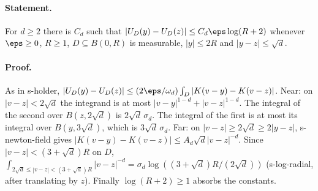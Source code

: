 \paragraph{Statement.} For $d\geq2$ there is $C_d$ such that $|U_D(y)-U_D(z)|\leq C_d\eps\log(R+2)$ whenever
$\eps\geq0$, $R\geq1$, $D\subseteq B(0,R)$ is measurable, $|y|\leq2R$ and $|y-z|\leq\sqrt d$.
\paragraph{Proof.} As in s-holder, $|U_D(y)-U_D(z)|\leq(2\eps/\omega_d)\int_D|K(v-y)-K(v-z)|$. Near: on
$|v-z|<2\sqrt d$ the integrand is at most $|v-y|^{1-d}+|v-z|^{1-d}$. The integral of the second over
$B(z,2\sqrt d)$ is $2\sqrt d\,\sigma_d$. The integral of the first is at most its integral over
$B(y,3\sqrt d)$, which is $3\sqrt d\,\sigma_d$. Far: on $|v-z|\geq2\sqrt d\geq2|y-z|$, s-newton-field gives
$|K(v-y)-K(v-z)|\leq A_d\sqrt d|v-z|^{-d}$. Since $|v-z|<(3+\sqrt d)R$ on $D$,
$\int_{2\sqrt d\leq|v-z|<(3+\sqrt d)R}|v-z|^{-d}=\sigma_d\log((3+\sqrt d)R/(2\sqrt d))$ (s-log-radial, after
translating by $z$). Finally $\log(R+2)\geq1$ absorbs the constants.
